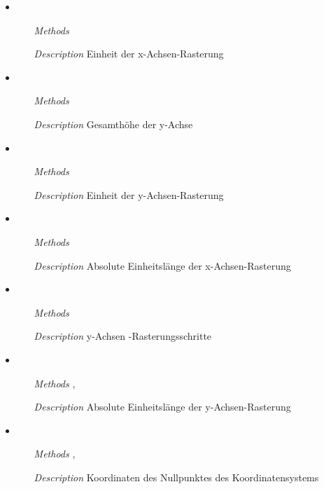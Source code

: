 \begin{itemize}
\item {}
\begin{enumerate}
\item[\textit{Methods}] 
\item[\textit{Description}] Einheit der x-Achsen-Rasterung
\end{enumerate}

\item {}
\begin{enumerate}
\item[\textit{Methods}] 
\item[\textit{Description}] Gesamth\"ohe der y-Achse
\end{enumerate}

\item {}
\begin{enumerate}
\item[\textit{Methods}] 
\item[\textit{Description}] Einheit der y-Achsen-Rasterung
\end{enumerate}

\item {}
\begin{enumerate}
\item[\textit{Methods}] 
\item[\textit{Description}] Absolute Einheitsl\"ange der
  x-Achsen-Rasterung
\end{enumerate}

\item {}
\begin{enumerate}
\item[\textit{Methods}] 
\item[\textit{Description}] y-Achsen -Rasterungsschritte
\end{enumerate}

\item {}
\begin{enumerate}
\item[\textit{Methods}] ,
\item[\textit{Description}] Absolute Einheitsl\"ange der
  y-Achsen-Rasterung
\end{enumerate}

\item {}
\begin{enumerate}
\item[\textit{Methods}] ,
\item[\textit{Description}] Koordinaten des Nullpunktes des
  Koordinatensystems
\end{enumerate}


\end{itemize}
